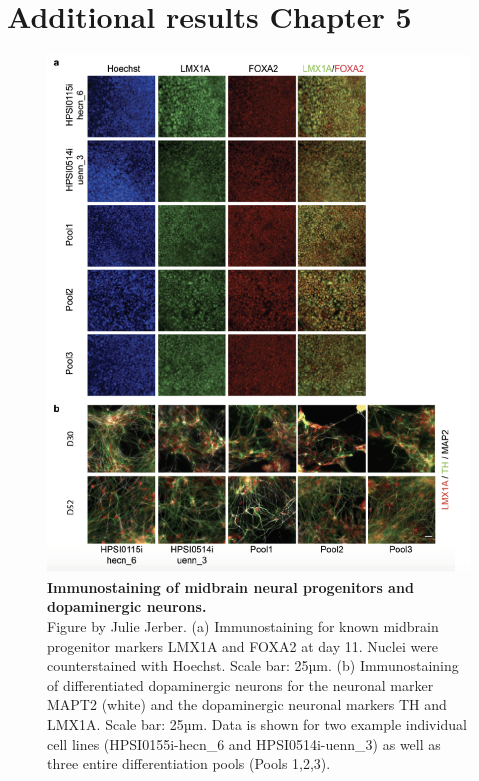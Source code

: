 
\clearpage

\section{Additional results Chapter 5}

\begin{figure}[h]
    \centering
    \includegraphics[width=14cm]{Appendix2/Fig/suppl_neuroseq_immunostaining.png}
    \caption[Immunostaining of midbrain neural progenitors and dopaminergic neurons]{\textbf{Immunostaining of midbrain neural progenitors and dopaminergic neurons.}\\
    Figure by Julie Jerber.
    (a) Immunostaining for known midbrain progenitor markers LMX1A and FOXA2 at day 11. 
    Nuclei were counterstained with Hoechst. 
    Scale bar: 25µm. 
    (b) Immunostaining of differentiated dopaminergic neurons for  the neuronal marker MAPT2 (white) and the dopaminergic neuronal markers TH and LMX1A. 
    Scale bar: 25µm. 
    Data is shown for two example individual cell lines (HPSI0155i-hecn\_6 and HPSI0514i-uenn\_3) as well as three entire differentiation pools (Pools 1,2,3).}
    \label{suppl_fig:immunostaining}
\end{figure}


